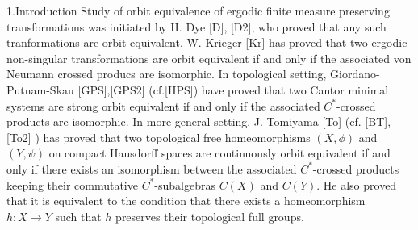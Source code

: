 \heading 1.Introduction
\endheading
Study of orbit equivalence of ergodic finite measure  preserving transformations was initiated by H. Dye [D], [D2], who proved that any such tranformations are orbit equivalent.
W. Krieger [Kr] has proved that two ergodic non-singular transformations are orbit equivalent if and only if the associated von Neumann crossed producs are isomorphic.
 In topological setting, Giordano-Putnam-Skau [GPS],[GPS2] (cf.[HPS]) have proved that two Cantor minimal systems are strong orbit equivalent 
 if and only if the associated $C^*$-crossed products are isomorphic.
In more general setting, 
J. Tomiyama [To]  (cf. [BT], [To2] ) has proved that    
two topological free homeomorphisms
$(X,\phi)$ and $(Y,\psi)$ on compact Hausdorff spaces
are continuously orbit equivalent if and only if 
there exists an isomorphism between the associated  $C^*$-crossed products 
keeping their commutative $C^*$-subalgebras $C(X)$ and $C(Y)$.
He also proved that it is equivalent to the condition that 
there exists a homeomorphism $h : X \rightarrow Y$ such that
$ h $ preserves their topological full groups.


